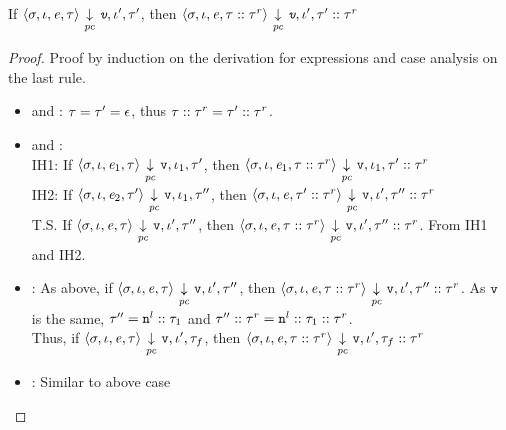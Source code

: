 \begin{myLemma}
\label{lem:app:lir:tr}
If $ \langle \sigma, \iota, \mathit{e}, \tau \rangle {~\underset{\mathit{pc}}{\downarrow}~} \emph{\texttt{v}},
\iota', \tau'$, then $ \langle \sigma, \iota, \mathit{e},
\tau::\tau^r \rangle {~\underset{\mathit{pc}}{\downarrow}~} \emph{\texttt{v}}, \iota', \tau'::\tau^r$ 
\end{myLemma}
\begin{proof}
  Proof by induction on the derivation for expressions and case analysis on
  the last rule.
  \begin{itemize}
  \item {} and :  $\tau = \tau'=\epsilon$, thus $\tau::\tau^r =
    \tau'::\tau^r$. 
  \item {} and :  \\
    IH1: If $ \langle \sigma, \iota, \mathit{e}_1, \tau
    \rangle {~\underset{\mathit{pc}}{\downarrow}~} \texttt{v}, \iota_1, \tau'$, then $
    \langle \sigma, \iota, \mathit{e}_1, 
    \tau::\tau^r \rangle {~\underset{\mathit{pc}}{\downarrow}~} \texttt{v}, \iota_1,
    \tau'::\tau^r$ \\
    IH2: If $ \langle \sigma, \iota, \mathit{e}_2, \tau' \rangle {~\underset{\mathit{pc}}{\downarrow}~} \texttt{v},
    \iota_1, \tau''$, then $ \langle \sigma, \iota, \mathit{e},
    \tau'::\tau^r \rangle {~\underset{\mathit{pc}}{\downarrow}~} \texttt{v}, \iota', \tau''::\tau^r$\\ 
    T.S. If $ \langle \sigma, \iota, \mathit{e}, \tau \rangle {~\underset{\mathit{pc}}{\downarrow}~} \texttt{v},
    \iota', \tau''$, then $ \langle \sigma, \iota, \mathit{e},
    \tau::\tau^r \rangle {~\underset{\mathit{pc}}{\downarrow}~} \texttt{v}, \iota',
    \tau''::\tau^r$. From IH1 and IH2.
  \item {}: As above, if $ \langle \sigma, \iota, \mathit{e}, \tau
    \rangle {~\underset{\mathit{pc}}{\downarrow}~} \texttt{v}, 
    \iota', \tau''$, then $ \langle \sigma, \iota, \mathit{e},
    \tau::\tau^r \rangle {~\underset{\mathit{pc}}{\downarrow}~} \texttt{v}, \iota',
    \tau''::\tau^r$. As $\texttt{v}$ is the same, $\tau'' = \texttt{n}^l :: \tau_1$
    and $\tau'' :: \tau^r = \texttt{n}^l::\tau_1::\tau^r$. \\
    Thus, if $
    \langle \sigma, \iota, \mathit{e}, \tau \rangle {~\underset{\mathit{pc}}{\downarrow}~} \texttt{v}, 
    \iota', \tau_f$, then $ \langle \sigma, \iota, \mathit{e},
    \tau::\tau^r \rangle {~\underset{\mathit{pc}}{\downarrow}~} \texttt{v}, \iota',
    \tau_f::\tau^r$
  \item {}: Similar to above case
\end{itemize}
\end{proof}

